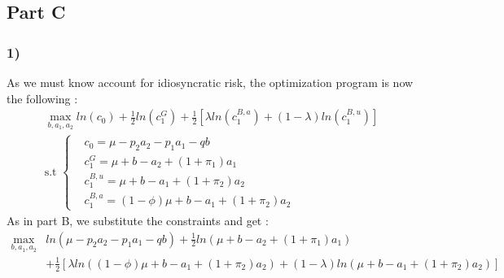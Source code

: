 \documentclass{article}
\begin{document}
\subsection{Part C}

\subsubsection{1)}
As we must know account for idiosyncratic risk, the optimization program is now the following : 
$$\begin{aligned}
    \max _{b,a_1,a_2} ln(c_0) + \frac{1}{2}ln(c_1^G)+\frac{1}{2}[\lambda ln(c_1^{B,a})+(1-\lambda)ln(c_1^{B,u})] \\
    \text{s.t }\left\{\begin{aligned}
    &c_0 = \mu -p_2a_2-p_1a_1-qb\\
    &c_1^G = \mu + b-a_2+(1+\pi_1)a_1\\
    &c_1^{B,u} = \mu +b-a_1+(1+\pi_2)a_2\\
    &c_1^{B,a}= (1-\phi)\mu + b -a_1 + (1+\pi_2)a_2
\end{aligned}\right.
\end{aligned}$$
As in part B, we substitute the constraints and get : 
$$\begin{aligned}
    \max _{b,a_1,a_2} &ln(\mu -p_2a_2-p_1a_1-qb) + \frac{1}{2}ln(\mu + b-a_2+(1+\pi_1)a_1)\\
    &+ \frac{1}{2}[\lambda ln((1-\phi)\mu + b -a_1 + (1+\pi_2)a_2) + (1-\lambda)ln(\mu +b-a_1+(1+\pi_2)a_2)]
\end{aligned} $$
\end{document}
